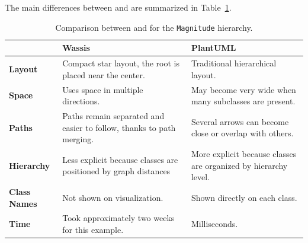 \documentclass[../../main.tex]{subfiles}
\begin{document}


The main differences between \wassis and \plantuml are summarized in Table~\ref{tab:wassis_plantuml_comparison}.

\begin{table}[ht]
    \centering
    \begin{tabular}{p{} p{} p{}}
        \textbf{} & \textbf{Wassis} & \textbf{PlantUML} \\ \hline
        \textbf{Layout} & Compact star layout, the root is placed near the center. & Traditional hierarchical layout. \\
        \textbf{Space} & Uses space in multiple directions. & May become very wide when many subclasses are present. \\
        \textbf{Paths} & Paths remain separated and easier to follow, thanks to path merging. & Several arrows can become close or overlap with others. \\
        \textbf{Hierarchy} & Less explicit because classes are positioned by graph distances & More explicit because classes are organized by hierarchy level. \\
        \textbf{Class Names} & Not shown on visualization. & Shown directly on each class. \\
        \textbf{Time} & Took approximately two weeks for this example. & Milliseconds. \\ \hline
    \end{tabular}
    \caption{Comparison between \wassis and \plantuml for the \texttt{Magnitude} hierarchy.}
    \label{tab:wassis_plantuml_comparison}
\end{table}
\end{document}

